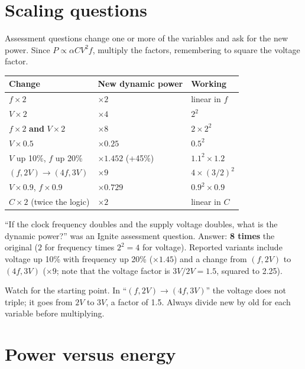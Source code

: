 \section{Scaling questions}
\label{sec:powerscaling}

Assessment questions change one or more of the variables and ask for the new power. Since $P \propto \alpha C V^2 f$, multiply the factors, remembering to square the voltage factor.

\begin{center}
\begin{tabular}{lll}
\toprule
Change & New dynamic power & Working \\
\midrule
$f \times 2$ & $\times 2$ & linear in $f$ \\
$V \times 2$ & $\times 4$ & $2^2$ \\
$f \times 2$ \textbf{and} $V \times 2$ & $\times 8$ & $2 \times 2^2$ \\
$V \times 0.5$ & $\times 0.25$ & $0.5^2$ \\
$V$ up 10\%, $f$ up 20\% & $\times 1.452$ (+45\%) & $1.1^2 \times 1.2$ \\
$(f, 2V) \to (4f, 3V)$ & $\times 9$ & $4 \times (3/2)^2$ \\
$V \times 0.9$, $f \times 0.9$ & $\times 0.729$ & $0.9^2 \times 0.9$ \\
$C \times 2$ (twice the logic) & $\times 2$ & linear in $C$ \\
\bottomrule
\end{tabular}
\end{center}

\begin{onoa}
``If the clock frequency doubles and the supply voltage doubles, what is the dynamic power?'' was an Ignite assessment question. Answer: \textbf{8 times} the original ($2$ for frequency times $2^2 = 4$ for voltage). Reported variants include voltage up 10\% with frequency up 20\% ($\times 1.45$) and a change from $(f, 2V)$ to $(4f, 3V)$ ($\times 9$; note that the voltage factor is $3V/2V = 1.5$, squared to 2.25).
\end{onoa}

\begin{trap}
Watch for the starting point. In ``$(f, 2V) \to (4f, 3V)$'' the voltage does not triple; it goes from $2V$ to $3V$, a factor of 1.5. Always divide new by old for each variable before multiplying.
\end{trap}

\section{Power versus energy}

